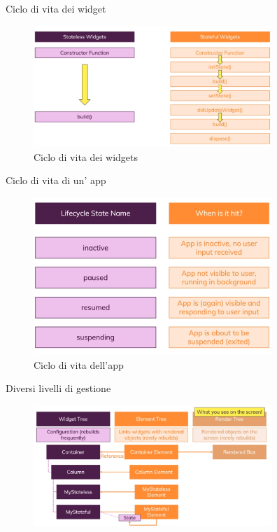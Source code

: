 \documentclass{../libs/presentation_format}
\begin{document}

\begin{frame}{Ciclo di vita dei widget}
	\begin{figure}[htpb]
		\centering
		\includegraphics[width=9cm]{../libs/widget-lifecycle.png}
		\caption{Ciclo di vita dei widgets}
		\label{fig: Ciclo di vita dei widgets}
	\end{figure}
\end{frame}


\begin{frame}{Ciclo di vita di un' app}
	\begin{figure}[htpb]
		\centering
		\includegraphics[width=9cm]{../libs/app-lifecycle.png}
		\caption{Ciclo di vita dell'app}
		\label{fig: Ciclo di vita dell'app}
	\end{figure}
\end{frame}


\begin{frame}{Diversi livelli di gestione}
	\begin{figure}[htpb]
		\centering
		\includegraphics[scale=0.5, width=9cm]{../libs/widget-tree-build.png}
	\end{figure}
\end{frame}
\end{document}
